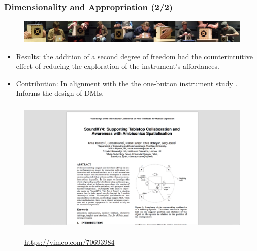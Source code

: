 \documentclass[screen, aspectratio=169]{beamer}
\begin{document}
%
\begin{frame}
\frametitle{Dimensionality and Appropriation (2/2)}	
\begin{figure}
	\includegraphics[scale=0.31]{img/Zappi-McPherson-2014-2.png}\\
    \end{figure}	
\begin{itemize}
\item Results: the addition of a second degree of freedom had the counterintuitive effect of reducing the exploration of the instrument's affordances.
\item Contribution: In alignment with the the one-button instrument study \cite{Gurevich.et.al.2010.NIME}. Informs the design of DMIs.
\end{itemize}
\end{frame}%
\begin{frame}
\frametitle{}
\begin{figure}
	\includegraphics[scale=0.31]{img/Xambo-et-al-2014.png}\\
	    \cite{Xambo.et.al.2014}\\
	    \url{https://vimeo.com/70693984}
    \end{figure}		
\end{frame}
%
\end{document}
